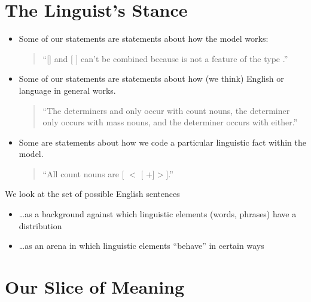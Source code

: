 \documentclass[a4paper,landscape,headrule,footrule]{foils}
\begin{document}
\overview


\section{The Linguist's Stance}


\begin{itemize}
\item Some of our statements are statements about how the model
works:
\begin{quote}
  “[] and [ ] can’t be combined because  is not a
  feature of the type .”
\end{quote}
\item Some of our statements are statements about how (we think)
English or language in general works.
\begin{quote}
  “The determiners  and  only occur with count nouns, the
  determiner  only occurs with mass nouns, and the determiner 
  occurs with either.”
\end{quote}
\item Some are statements about how we code a particular
linguistic fact within the model.
\begin{quote}
  “All count nouns are [  $<$ [ +]$>$].”
\end{quote}
\end{itemize}


We look at the set of possible English sentences
\begin{itemize}
\item \ldots  as a background against which linguistic
  elements (words, phrases) have a distribution
\item \ldots  as an arena in which linguistic elements
  “behave” in certain ways
\end{itemize}



\section[Which aspects of meaning we model]{Our Slice of Meaning}

\end{document}
